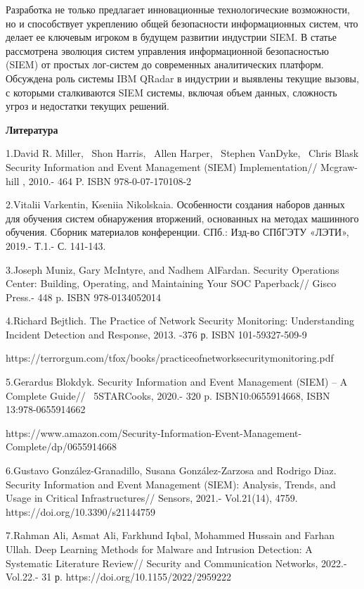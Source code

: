 Разработка не только предлагает инновационные технологические
возможности, но и способствует укреплению общей безопасности
информационных систем, что делает ее ключевым игроком в будущем развитии
индустрии SIEM. В статье рассмотрена эволюция систем управления
информационной безопасностью (SIEM) от простых лог-систем до современных
аналитических платформ. Обсуждена роль системы IBM QRadar в индустрии и
выявлены текущие вызовы, с которыми сталкиваются SIEM системы, включая
объем данных, сложность угроз и недостатки текущих решений.

\textbf{Литература}

1.David R. Miller,~ Shon Harris,~ Allen Harper,~ Stephen VanDyke,~ Chris
Blask Security Information and Event Management (SIEM) Implementation//
Mcgraw-hill , 2010.- 464 P. ISBN 978-0-07-170108-2

2.Vitalii Varkentin, Kseniia Nikolskaia. Особенности создания наборов
данных для обучения систем обнаружения вторжений, основанных на методах
машинного обучения. Сборник материалов конференции. СПб.: Изд-во СПбГЭТУ
«ЛЭТИ», 2019.- Т.1.- С. 141-143.

3.Joseph Muniz, Gary McIntyre, and Nadhem AlFardan. Security Operations
Center: Building, Operating, and Maintaining Your SOC Paperback// Gisco
Press.- 448 p. ISBN 978-0134052014

4.Richard Bejtlich. The Practice of Network Security Monitoring:
Understanding Incident Detection and Response, 2013. -376 р. ISBN
101-59327-509-9

https://terrorgum.com/tfox/books/practiceofnetworksecuritymonitoring.pdf

5.Gerardus Blokdyk. Security Information and Event Management (SIEM) --
A Complete Guide// ~5STARCooks, 2020.- 320 p. ISBN10:0655914668, ISBN
13:978-0655914662

https://www.amazon.com/Security-Information-Event-Management-Complete/dp/0655914668

6.Gustavo González-Granadillo, Susana González-Zarzosa and Rodrigo Diaz.
Security Information and Event Management (SIEM): Analysis, Trends, and
Usage in Critical Infrastructures// Sensors, 2021.- Vol.21(14), 4759.
https://doi.org/10.3390/s21144759

7.Rahman Ali, Asmat Ali, Farkhund Iqbal, Mohammed Hussain and Farhan
Ullah. Deep Learning Methods for Malware and Intrusion Detection: A
Systematic Literature Review// Security and Communication Networks,
2022.- Vol.22.- 31 р. https://doi.org/10.1155/2022/2959222

